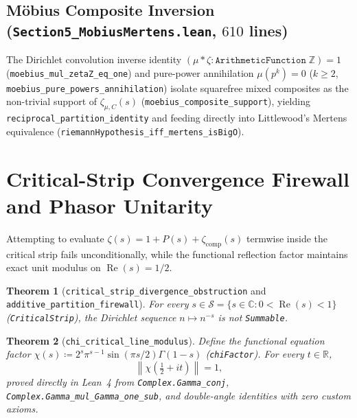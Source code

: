 \documentclass[11pt,a4paper]{article}
\newtheorem{theorem}{Theorem}[section]
\theoremstyle{definition}
\newcommand{\Zset}{\mathbb{Z}}
\newcommand{\Rset}{\mathbb{R}}
\newcommand{\Cfield}{\mathbb{C}}
\begin{document}
\subsection{M\"obius Composite Inversion (\texttt{Section5\_\allowbreak MobiusMertens.lean}, $610$ lines)}
The Dirichlet convolution inverse identity $(\mu * \zeta : \texttt{ArithmeticFunction}\;\Zset) = 1$ (\texttt{moebius\_\allowbreak mul\_\allowbreak zetaZ\_\allowbreak eq\_\allowbreak one}) and pure-power annihilation $\mu(p^k) = 0$ ($k \ge 2$, \texttt{moebius\_\allowbreak pure\_\allowbreak powers\_\allowbreak annihilation}) isolate squarefree mixed composites as the non-trivial support of $\zeta_{\mu,C}(s)$ (\texttt{moebius\_\allowbreak composite\_\allowbreak support}), yielding \texttt{reciprocal\_\allowbreak partition\_\allowbreak identity} and feeding directly into Littlewood's Mertens equivalence (\texttt{riemannHypothesis\_\allowbreak iff\_\allowbreak mertens\_\allowbreak isBigO}).

\section{Critical-Strip Convergence Firewall and Phasor Unitarity}\label{sec:section6}

Attempting to evaluate $\zeta(s) = 1 + P(s) + \zeta_{\mathrm{comp}}(s)$ termwise inside the critical strip fails unconditionally, while the functional reflection factor maintains exact unit modulus on $\operatorname{Re}(s) = 1/2$.

\begin{theorem}[\texttt{critical\_\allowbreak strip\_\allowbreak divergence\_\allowbreak obstruction} and \texttt{additive\_\allowbreak partition\_\allowbreak firewall}]
For every $s \in \mathcal{S} = \{s \in \Cfield : 0 < \operatorname{Re}(s) < 1\}$ (\texttt{CriticalStrip}), the Dirichlet sequence $n \mapsto n^{-s}$ is not \texttt{Summable}.
\end{theorem}

\begin{theorem}[\texttt{chi\_\allowbreak critical\_\allowbreak line\_\allowbreak modulus}]
Define the functional equation factor $\chi(s) \coloneqq 2^s \pi^{s-1} \sin(\pi s / 2) \Gamma(1 - s)$ (\texttt{chiFactor}). For every $t \in \Rset$,
\begin{equation}
\left\| \chi\!\left(\tfrac{1}{2} + it\right) \right\| = 1,
\end{equation}
proved directly in Lean~4 from \texttt{Complex.\allowbreak Gamma\_\allowbreak conj}, \texttt{Complex.\allowbreak Gamma\_\allowbreak mul\_\allowbreak Gamma\_\allowbreak one\_\allowbreak sub}, and double-angle identities with zero custom axioms.
\end{theorem}
\end{document}
